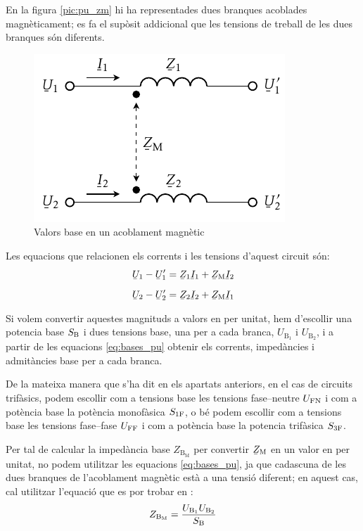En la figura \vref{pic:pu_zm} hi ha representades dues branques acoblades magn\`{e}ticament; es fa el sup\`{o}sit addicional que les tensions de treball de les dues branques s\'{o}n diferents.
\begin{figure}[h]
\centering
    \vspace{5mm}
    \includegraphics{Imatges/Cap-Fonaments-pu-ZM.pdf}
    \caption{Valors base en un acoblament magn\`{e}tic} \label{pic:pu_zm}
\end{figure}

Les equacions que relacionen els corrents i les tensions d'aquest circuit s\'{o}n:
\begin{subequations}
\begin{align}
    \cmplx{U}_1 - \cmplx{U}'_1 &= \cmplx{Z}_1 \cmplx{I}_1 + \cmplx{Z}\ped{M} \cmplx{I}_2   \\[2mm]
    \cmplx{U}_2 - \cmplx{U}'_2 &= \cmplx{Z}_2 \cmplx{I}_2 + \cmplx{Z}\ped{M} \cmplx{I}_1
\end{align}
\end{subequations}

Si volem convertir aquestes magnituds a valors en per unitat, hem d'escollir  una potencia base $S_\mathrm{B}$ i dues tensions base, una  per a cada branca, $U_{\text{B}_1}$ i  $U_{\text{B}_2}$, i a partir de les equacions \eqref{eq:bases_pu} obtenir els corrents, imped\`{a}ncies i admit\`{a}ncies base per a cada branca.

De la mateixa manera que s'ha dit en els apartats anteriors, en el cas de circuits trif\`{a}sics, podem escollir com a tensions base les tensions fase--neutre $U_\mathrm{FN}$ i com a pot\`{e}ncia base la pot\`{e}ncia  monof\`{a}sica $S_\mathrm{1F}$, o b\'{e} podem escollir com a tensions base les tensions fase--fase $U_\mathrm{FF}$ i com a pot\`{e}ncia base la potencia trif\`{a}sica $S_\mathrm{3F}$.


Per tal de calcular la imped\`{a}ncia base $Z_{\text{B}_\text{M}}$ per convertir $\cmplx{Z}\ped{M}$ en un valor en per unitat, no podem utilitzar les equacions \eqref{eq:bases_pu}, ja que cadascuna de les dues branques de l'acoblament magn\`{e}tic est\`{a} a una tensi\'{o} diferent; en aquest cas, cal utilitzar l'equaci\'{o} que es por trobar en \cite{TLE}:
\begin{equation}
    Z_{\text{B}_\text{M}} = \frac{U_{\text{B}_1} U_{\text{B}_2}} {S_\mathrm{B}}
\end{equation}

